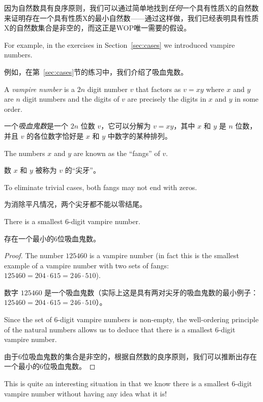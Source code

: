 因为自然数具有良序原则，我们可以通过简单地找到\emph{任何}一个具有性质X的自然数来证明存在一个具有性质X的最小自然数——通过这样做，我们已经表明具有性质X的自然数集合是非空的，而这正是WOP唯一需要的假设。

For example, in the exercises in Section~\ref{sec:cases} we
introduced vampire numbers.

例如，在第~\ref{sec:cases}节的练习中，我们介绍了吸血鬼数。

A  \emph{vampire number}
is a
$2n$ digit number $v$ that factors as $v=xy$
where $x$ and $y$ are $n$ digit numbers and the digits of $v$ are precisely the digits in $x$ and $y$ in some order.

一个\emph{吸血鬼数}是一个 $2n$ 位数 $v$，它可以分解为 $v=xy$，其中 $x$ 和 $y$ 是 $n$ 位数，并且 $v$ 的各位数字恰好是 $x$ 和 $y$ 中数字的某种排列。

The numbers $x$ and $y$
are known as the ``fangs'' of $v$.

数 $x$ 和 $y$ 被称为 $v$ 的“尖牙”。

To eliminate trivial
cases, both fangs may not end with zeros.

为消除平凡情况，两个尖牙都不能以零结尾。


\begin{thm}
      There is a smallest 6-digit vampire number.

      存在一个最小的6位吸血鬼数。
\end{thm}

\begin{proof}
      The number $125460$ is a vampire number (in fact this is the smallest
      example of a vampire number with two sets of fangs:
      $125460 = 204\cdot 615 = 246\cdot 510$).

      数字 $125460$ 是一个吸血鬼数（实际上这是具有两对尖牙的吸血鬼数的最小例子：$125460 = 204\cdot 615 = 246\cdot 510$）。

      Since the set of 6-digit vampire
      numbers is non-empty, the well-ordering principle of the natural numbers
      allows us to deduce that there is a smallest 6-digit vampire number.

      由于6位吸血鬼数的集合是非空的，根据自然数的良序原则，我们可以推断出存在一个最小的6位吸血鬼数。
\end{proof}

This is quite an interesting situation in that we know there is a smallest
6-digit vampire number without having any idea what it is!

